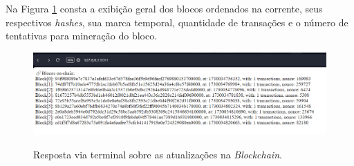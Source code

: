 Na Figura \ref*{fig:navegador} consta a exibição geral dos blocos ordenados na corrente, seus respectivos \textit{hashes}, sua marca temporal, quantidade de transações e o número de tentativas para mineração do bloco.

\begin{figure} [h]
	\centering
	\caption{Resposta via terminal sobre as atualizações na \textit{Blockchain}.}
	\includegraphics[width=.8\linewidth]{../images/navegador-blockchain.png}
	\label{fig:navegador}

\end{figure}


